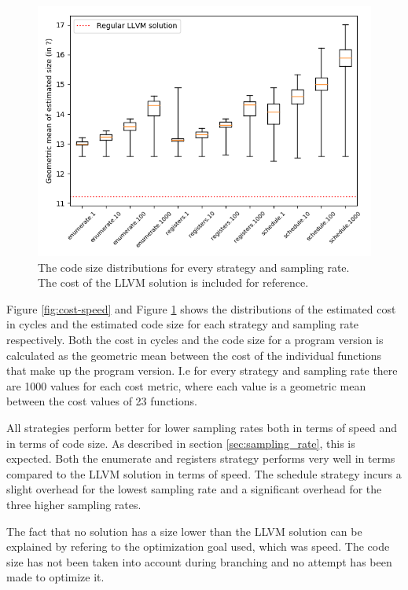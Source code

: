 \begin{figure}[h]
	\centering
	\includegraphics[width=\textwidth,height=0.5\textheight]{results/figures/cost_size}
	\caption{The code size distributions for every strategy and sampling rate. The cost of the LLVM solution is included for reference.}
	\label{fig:cost-size}
\end{figure}

Figure \ref{fig:cost-speed} and Figure \ref{fig:cost-size} shows the distributions of the
estimated cost in cycles and the estimated code size for each strategy and sampling rate
respectively. Both the cost in cycles and the code size for a program version is
calculated as the geometric mean between the cost of the individual functions that make
up the program version. I.e for every strategy and sampling rate there are 1000 values for
each cost metric, where each value is a geometric mean between the cost values of 23
functions.

All strategies perform better for lower sampling rates both in terms of speed and in terms
of code size. As described in section \ref{sec:sampling_rate}, this is expected. Both the
enumerate and registers strategy performs very well in terms compared to the LLVM solution
in terms of speed. The schedule strategy incurs a slight overhead for the lowest sampling
rate and a significant overhead for the three higher sampling rates.

The fact that no solution has a size lower than the LLVM solution can be explained by
refering to the optimization goal used, which was speed. The code size has not been taken
into account during branching and no attempt has been made to optimize it.


